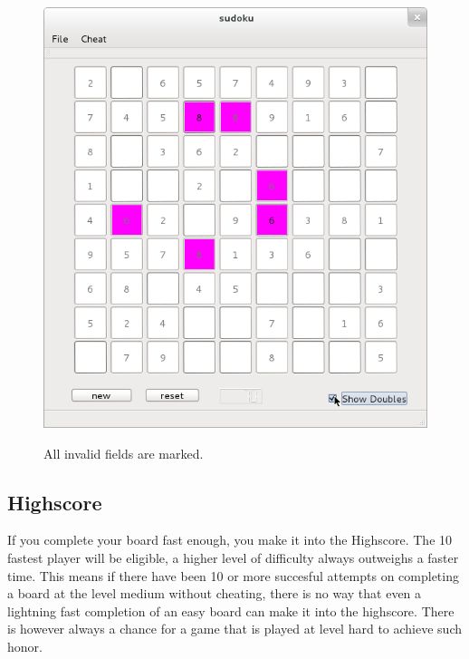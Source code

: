 \documentclass[a4paper,11pt]{article}
\begin{document}
\begin{figure}[H]
  \begin{center}
    \includegraphics{img/showDoubles.png}
    \label{fig:}
    \caption{All invalid fields are marked.}
  \end{center}
\end{figure}

\subsection{Highscore}

If you complete your board fast enough, you make it into the Highscore. The 10 fastest player will be eligible, a higher level of difficulty always outweighs a faster time. This means if there have been 10 or more succesful attempts on completing a board at the level medium without cheating, there is no way that even a lightning fast completion of an easy board can make it into the highscore. There is however always a chance for a game that is played at level hard to achieve such honor.
\end{document}
